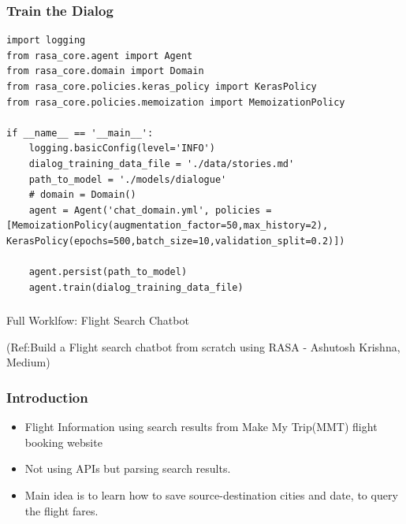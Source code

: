  \begin{frame}[fragile]\frametitle{Train the Dialog}
\begin{lstlisting}
import logging
from rasa_core.agent import Agent
from rasa_core.domain import Domain
from rasa_core.policies.keras_policy import KerasPolicy
from rasa_core.policies.memoization import MemoizationPolicy

if __name__ == '__main__':
    logging.basicConfig(level='INFO')
    dialog_training_data_file = './data/stories.md'
    path_to_model = './models/dialogue'
    # domain = Domain()
    agent = Agent('chat_domain.yml', policies = [MemoizationPolicy(augmentation_factor=50,max_history=2), KerasPolicy(epochs=500,batch_size=10,validation_split=0.2)])

    agent.persist(path_to_model)
    agent.train(dialog_training_data_file)
\end{lstlisting}
\end{frame}

\begin{frame}[fragile]\frametitle{}
\begin{center}
{\Large Full Worklfow: Flight Search Chatbot}
\end{center}

{\tiny (Ref:Build a Flight search chatbot from scratch using RASA - Ashutosh Krishna, Medium)}
\end{frame}

 \begin{frame}[fragile]\frametitle{Introduction}
\begin{itemize}
\item Flight Information using search results from Make My Trip(MMT) flight booking website	
\item Not using APIs but parsing search results.
\item Main idea is to learn how to save source-destination cities and date, to query the flight fares.
\end{itemize}

\end{frame}

